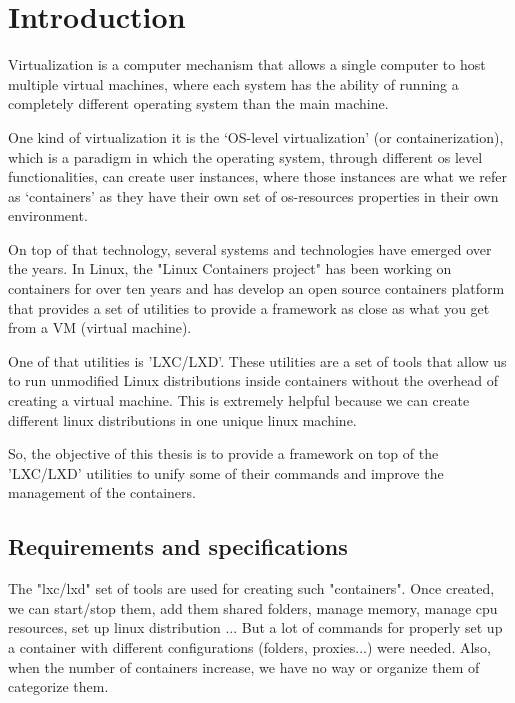 
\clearpage\section{Introduction}\label{sec:introduction}         %

Virtualization is a computer mechanism that allows a single computer to host multiple virtual machines, where each system has the ability of running a completely different operating system than the main machine. 

One kind of virtualization it is the `OS-level virtualization' (or containerization), which is a paradigm in which the operating system, through different os level functionalities, can create user instances, where those instances are what we refer as `containers' as they have their own set of os-resources properties in their own environment.

On top of that technology, several systems and technologies have emerged over the years. In Linux, the "Linux Containers project" has been working on containers for over ten years and has develop an open source containers platform that provides a set of utilities to provide a framework as close as what you get from a VM (virtual machine). 

One of that utilities is 'LXC/LXD'. These utilities are a set of tools that allow us to run unmodified Linux distributions inside containers without the overhead of creating a virtual machine. This is extremely helpful because we can create different linux distributions in one unique linux machine.

So, the objective of this thesis is to provide a framework on top of the 'LXC/LXD' utilities to unify some of their commands and improve the management of the containers.

\bigskip

\subsection{Requirements and specifications}
\label{ssec:requirements}
The "lxc/lxd" set of tools are used for creating such "containers". Once created, we can start/stop them, add them shared folders, manage memory, manage cpu resources, set up linux distribution ...
But a lot of commands for properly set up a container with different configurations (folders, proxies...) were needed. Also, when the number of containers increase, we have no way or organize them of categorize them.

